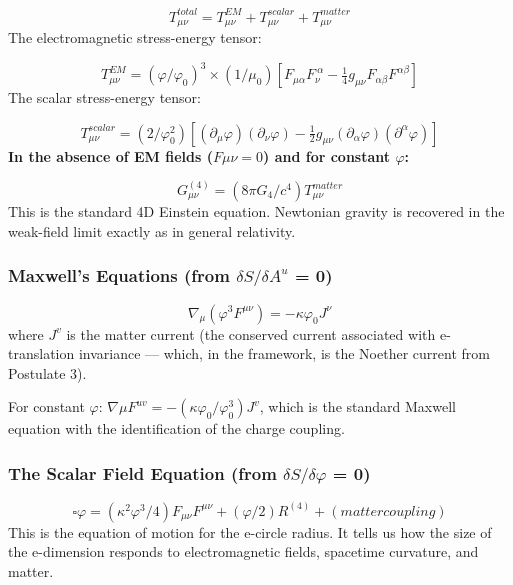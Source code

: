 \documentclass[aps,prd,preprint,superscriptaddress,longbibliography,floatfix]{revtex4-2}
\theoremstyle{remark}
\begin{document}
\begin{equation}
    T_{\mu\nu}^{total} = T_{\mu\nu}^{EM} + T_{\mu\nu}^{scalar} + T_{\mu\nu}^{matter}
\end{equation}
The electromagnetic stress-energy tensor:


\begin{equation}
    T_{\mu\nu}^{EM} = (\varphi/\varphi_{0})^{3} \times (1/\mu_{0})[F_{\mu\alpha}F_{\nu}^{\ \alpha} - \tfrac{1}{4}g_{\mu\nu} F_{\alpha\beta}F^{\alpha\beta}]
\end{equation}
The scalar stress-energy tensor:


\begin{equation}
    T_{\mu\nu}^{scalar} = (2/\varphi_{0}^{2})[(\partial_{\mu}\varphi)(\partial_{\nu}\varphi) - \tfrac{1}{2}g_{\mu\nu}(\partial_{\alpha}\varphi)(\partial^{\alpha}\varphi)]
\end{equation}
\textbf{In the absence of EM fields ($F\mu\nu = 0$) and for constant $\varphi$:}


\begin{equation}
    G_{\mu\nu}^{(4)} = (8\pi G_{4}/c^{4}) T_{\mu\nu}^{matter}
\end{equation}
This is the standard 4D Einstein equation. Newtonian gravity is recovered in the weak-field limit exactly as in general relativity.


\subsubsection{Maxwell's Equations (from $\delta S/\delta A^{u}$ = 0)}


\begin{equation}
    \nabla_{\mu}(\varphi^{3} F^{\mu\nu}) = -\kappa\varphi_{0} J^{\nu}
\end{equation}
where $J^{v}$ is the matter current (the conserved current associated with e-translation invariance --- which, in the framework, is the Noether current from Postulate 3).

For constant $\varphi$: $\nabla\mu F^{uv} = -(\kappa\varphi_{0}/\varphi_{0}^{3}) J^{v}$, which is the standard Maxwell equation with the identification of the charge coupling.


\subsubsection{The Scalar Field Equation (from $\delta S/\delta\varphi$ = 0)}


\begin{equation}
    \square\varphi = (\kappa^{2}\varphi^{3}/4) F_{\mu\nu}F^{\mu\nu} + (\varphi/2) R^{(4)} + (matter coupling)
\end{equation}
This is the equation of motion for the e-circle radius. It tells us how the size of the e-dimension responds to electromagnetic fields, spacetime curvature, and matter.
\end{document}
